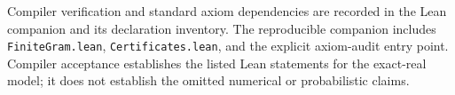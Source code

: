 Compiler verification and standard axiom dependencies are recorded in the
Lean companion and its declaration inventory.  The reproducible companion
includes \texttt{FiniteGram.lean}, \texttt{Certificates.lean}, and the explicit
axiom-audit entry point.  Compiler acceptance establishes the listed Lean
statements for the exact-real model; it does not establish the omitted
numerical or probabilistic claims.
